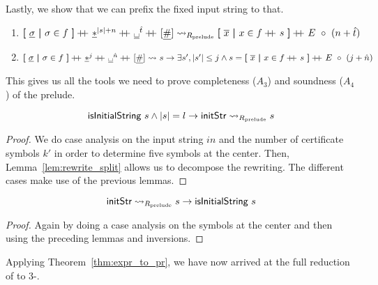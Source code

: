 Lastly, we show that we can prefix the fixed input string to that.
\begin{lemma}\leavevmode
  \begin{enumerate}
    \item $\withl \underline{\sigma} \withm \sigma \in f \withr \concat{} \nstar^{\length{s} + n} \concat{} \nblank^{\hat{t}} \concat{} [\ndelim] \strent{\Rprelude} \withl \overline{x} \withm x \in f \concat{} s\withr \concat{} \nilstr{\circ}{(n+\hat{t})}$
    \item $\withl \underline{\sigma} \withm \sigma \in f \withr \concat{} \nstar^j \concat \nblank^{\hat{n}} \concat{} [\ndelim] \strent{} s \rightarrow \exists s', \length{s'} \le j \land s = \withl \overline{x} \withm x \in f \concat{} s \withr \concat{} \nilstr{\circ}{(j + \hat{n})} $
  \end{enumerate}
\end{lemma}



This gives us all the tools we need to prove completeness ($A_3$) and soundness ($A_4$) of the prelude.
\begin{lemma}[Completeness]\label{lem:prelude_complete}
  \[ \textsf{isInitialString}~s \land |s| = l \rightarrow \textsf{initStr} \rightsquigarrow_{R_{\text{prelude}}} s \]
\end{lemma}
\begin{proof}
  We do case analysis on the input string $in$ and the number of certificate symbols $k'$ in order to determine five symbols at the center. Then, Lemma~\ref{lem:rewrite_split} allows us to decompose the rewriting. The different cases make use of the previous lemmas.
\end{proof}

\begin{lemma}[Soundness]\label{lem:prelude_sound}
  \[ \textsf{initStr} \rightsquigarrow_{R_{\text{prelude}}} s \rightarrow \textsf{isInitialString}~s \]
\end{lemma}
\begin{proof}
  Again by doing a case analysis on the symbols at the center and then using the preceding lemmas and inversions. 
\end{proof}

Applying Theorem~\ref{thm:expr_to_pr}, we have now arrived at the full reduction of \gennp{} to 3-\PR{}.

